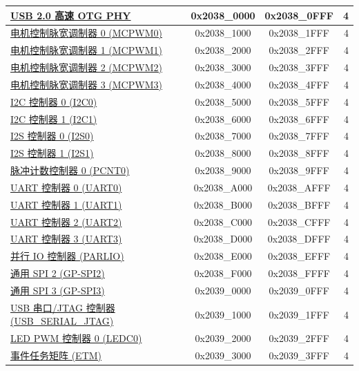\begin{ThreePartTable}
\begin{longtable}[c]{ |p{7cm}|c|c|r| }
    \hyperref[mod:usbotghs]{USB 2.0 高速 OTG PHY} & 0x2038\_0000 & 0x2038\_0FFF &   4\\\hline
    \hyperref[mod:mcpwm]{电机控制脉宽调制器 0 (MCPWM0)} & 0x2038\_1000 & 0x2038\_1FFF &   4\\\hline
    \hyperref[mod:mcpwm]{电机控制脉宽调制器 1 (MCPWM1)} & 0x2038\_2000 & 0x2038\_2FFF &   4\\\hline
    \hyperref[mod:mcpwm]{电机控制脉宽调制器 2 (MCPWM2)} & 0x2038\_3000 & 0x2038\_3FFF &   4\\\hline
    \hyperref[mod:mcpwm]{电机控制脉宽调制器 3 (MCPWM3)} & 0x2038\_4000 & 0x2038\_4FFF &   4\\\hline
    \hyperref[mod:i2c]{I2C 控制器 0 (I2C0)} & 0x2038\_5000 & 0x2038\_5FFF &   4\\\hline
    \hyperref[mod:i2c]{I2C 控制器 1 (I2C1)} & 0x2038\_6000 & 0x2038\_6FFF &   4\\\hline
    \hyperref[mod:i2s]{I2S 控制器 0 (I2S0)} & 0x2038\_7000 & 0x2038\_7FFF &   4\\\hline
    \hyperref[mod:i2s]{I2S 控制器 1 (I2S1)} & 0x2038\_8000 & 0x2038\_8FFF &   4\\\hline
    \hyperref[mod:pcnt]{脉冲计数控制器 0 (PCNT0)} & 0x2038\_9000 & 0x2038\_9FFF &   4\\\hline
    \hyperref[mod:uart]{UART 控制器 0 (UART0)} & 0x2038\_A000 & 0x2038\_AFFF &   4\\\hline
    \hyperref[mod:uart]{UART 控制器 1 (UART1)} & 0x2038\_B000 & 0x2038\_BFFF &   4\\\hline
    \hyperref[mod:uart]{UART 控制器 2 (UART2)} & 0x2038\_C000 & 0x2038\_CFFF &   4\\\hline
    \hyperref[mod:uart]{UART 控制器 3 (UART3)} & 0x2038\_D000 & 0x2038\_DFFF &   4\\\hline
    \hyperref[mod:parlio]{并行 IO 控制器 (PARLIO)} & 0x2038\_E000 & 0x2038\_EFFF &   4\\\hline
    \hyperref[mod:spi]{通用 SPI 2 (GP-SPI2)} & 0x2038\_F000 & 0x2038\_FFFF &   4\\\hline
    \hyperref[mod:spi]{通用 SPI 3 (GP-SPI3)} & 0x2039\_0000 & 0x2039\_0FFF &   4\\\hline
    \hyperref[mod:usbserialjtag]{USB 串口/JTAG 控制器 (USB\_SERIAL\_JTAG)} & 0x2039\_1000 & 0x2039\_1FFF &   4\\\hline
    \hyperref[mod:ledpwm]{LED PWM 控制器 0 (LEDC0)} & 0x2039\_2000 & 0x2039\_2FFF &   4\\\hline
    \hyperref[mod:evntaskmatrix]{事件任务矩阵 (ETM)} & 0x2039\_3000 & 0x2039\_3FFF &   4\\\hline

\end{longtable}
\end{ThreePartTable}
